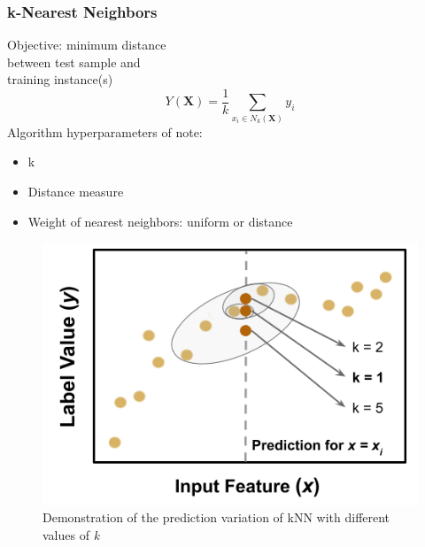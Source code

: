 \begin{frame}
  \frametitle{k-Nearest Neighbors}
  \begin{minipage}{0.48\textwidth}
    Objective: minimum distance \\ between test sample and \\ training instance(s)
    $$ Y(\boldsymbol{X}) = \frac{1}{k} \sum_{x_i \in N_k(\boldsymbol{X})} y_i $$
    Algorithm hyperparameters of note:
    \begin{itemize}
      \item k
      \item Distance measure
      \item Weight of nearest neighbors: uniform or distance
    \end{itemize}
  \end{minipage}%
  \hfill
  \begin{minipage}{0.48\textwidth}
    \begin{figure}[h!]
      \centering
      \includegraphics[height=0.5\textheight]{./figures/nn-fig.png}
      \caption{Demonstration of the prediction variation of kNN with different values of \textit{k}}
    \end{figure}
  \end{minipage}
\end{frame}

